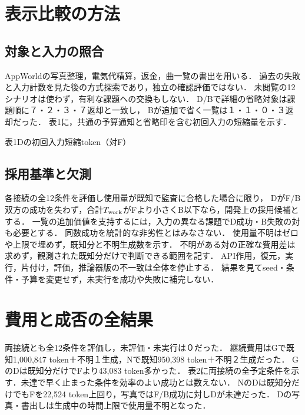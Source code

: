 \documentclass[uplatex,a4paper,twocolumn,10pt]{jsarticle}
\begin{document}
\section{表示比較の方法}



\subsection{対象と入力の照合}
AppWorld\cite{appworld}の写真整理，電気代精算，返金，曲一覧の書出を用いる．
過去の失敗と入力計数を見た後の方式探索であり，独立の確認評価ではない．
未閲覧の12シナリオは使わず，有利な課題への交換もしない．
D/Bで詳細の省略対象は課題順に７・２・３・７返却と一致し，
Bが追加で省く一覧は１・１・０・３返却だった．
表1に，共通の予算通知と省略印を含む初回入力の短縮量を示す．

\begin{center}\begin{minipage}{\columnwidth}\centering
\small 表1\quad Dの初回入力短縮token（対F）\par\smallskip
\PublicDisplayInitialSavings
\end{minipage}\end{center}

\subsection{採用基準と欠測}
各接続の全12条件を評価し使用量が既知で監査に合格した場合に限り，
DがF/B双方の成功を失わず，合計$T_{\rm work}$がFより小さくB以下なら，開発上の採用候補とする．
一覧の追加価値を支持するには，入力の異なる課題でD成功・B失敗の対も必要とする．
同数成功を統計的な非劣性とはみなさない．
使用量不明はゼロや上限で埋めず，既知分と不明生成数を示す．
不明がある対の正確な費用差は求めず，観測された既知分だけで判断できる範囲を記す．
API作用，復元，実行，片付け，評価，推論器版の不一致は全体を停止する．
結果を見てseed・条件・予算を変更せず，未実行を成功や失敗に補完しない．

\section{費用と成否の全結果}
両接続とも全12条件を評価し，未評価・未実行は０だった．
継続費用はGで既知1,000,847 token＋不明１生成，Nで既知950,398 token＋不明２生成だった．
GのDは既知分だけでFより43,083 token多かった．
表2に両接続の全予定条件を示す．未達で早く止まった条件を効率のよい成功とは数えない．
NのDは既知分だけでもFを22,524 token上回り，写真ではF/B成功に対しDが未達だった．
Dの写真・書出しは生成中の時間上限で使用量不明となった．
\end{document}
